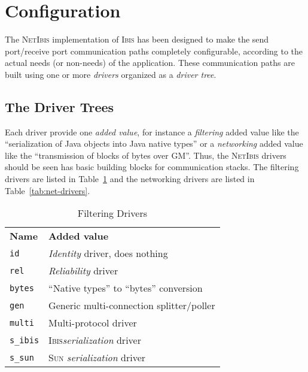 \documentclass[11pt]{book}
\def\sep{\\[0.5ex]}
\def\Ibis{\textsc{Ibis}\xspace}
\def\NetIbis{\textsc{NetIbis}\xspace}
\begin{document}
\section{Configuration}
\label{sec:configuration}

The \NetIbis implementation of \Ibis has been designed to make the
send port/receive port communication paths completely configurable,
according to the actual needs (or non-needs) of the application. These
communication paths are built using one or more \textit{drivers}
organized as a \textit{driver tree}.

\subsection{The Driver Trees}
\label{sec:driver-trees}

Each driver provide one \textit{added value}, for instance a
\textit{filtering} added value like the ``serialization of Java
objects into Java native types'' or a \textit{networking} added value
like the ``transmission of blocks of bytes over GM''. Thus, the
\NetIbis drivers should be seen has basic building blocks for
communication stacks. The filtering drivers are listed in
Table~\ref{tab:filter-drivers} and the networking drivers are listed
in Table~\ref{tab:net-drivers}.

\begin{table}[htbp]
  \centering
  \begin{tabular}{p{2cm}p{10cm}}
    \hline
    \textbf{Name}    & \textbf{Added value} \sep
    \texttt{id}      & \textit{Identity} driver, does nothing\\
    \texttt{rel}     & \textit{Reliability} driver\\
    \texttt{bytes}   & ``Native types'' to ``bytes'' conversion\sep
    \texttt{gen}     & Generic multi-connection splitter/poller\\
    \texttt{multi}   & Multi-protocol driver\sep
    \texttt{s\_ibis} & \Ibis \textit{serialization} driver\\
    \texttt{s\_sun}  & \textsc{Sun} \emph{serialization} driver\\
    \hline
  \end{tabular}
  \caption{Filtering Drivers}
  \label{tab:filter-drivers}
\end{table}
\end{document}
